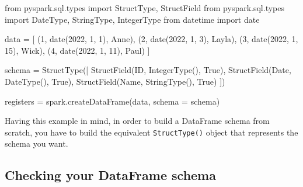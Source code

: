 \documentclass[
  11pt,
  letterpaper,
  DIV=11,
  numbers=noendperiod]{scrreprt}
\newenvironment{Shaded}{\begin{snugshade}}{\end{snugshade}}
\newcommand{\DecValTok}[1]{\textcolor[rgb]{0.68,0.00,0.00}{#1}}
\newcommand{\ImportTok}[1]{\textcolor[rgb]{0.00,0.46,0.62}{#1}}
\newcommand{\NormalTok}[1]{\textcolor[rgb]{0.00,0.23,0.31}{#1}}
\newcommand{\OperatorTok}[1]{\textcolor[rgb]{0.37,0.37,0.37}{#1}}
\newcommand{\StringTok}[1]{\textcolor[rgb]{0.13,0.47,0.30}{#1}}
\newcommand{\VariableTok}[1]{\textcolor[rgb]{0.07,0.07,0.07}{#1}}
\begin{document}
\begin{Shaded}
\begin{Highlighting}[]
\ImportTok{from}\NormalTok{ pyspark.sql.types }\ImportTok{import}\NormalTok{ StructType, StructField}
\ImportTok{from}\NormalTok{ pyspark.sql.types }\ImportTok{import}\NormalTok{ DateType, StringType, IntegerType}
\ImportTok{from}\NormalTok{ datetime }\ImportTok{import}\NormalTok{ date}

\NormalTok{data }\OperatorTok{=}\NormalTok{ [}
\NormalTok{  (}\DecValTok{1}\NormalTok{, date(}\DecValTok{2022}\NormalTok{, }\DecValTok{1}\NormalTok{, }\DecValTok{1}\NormalTok{), }\StringTok{\textquotesingle{}Anne\textquotesingle{}}\NormalTok{),}
\NormalTok{  (}\DecValTok{2}\NormalTok{, date(}\DecValTok{2022}\NormalTok{, }\DecValTok{1}\NormalTok{, }\DecValTok{3}\NormalTok{), }\StringTok{\textquotesingle{}Layla\textquotesingle{}}\NormalTok{),}
\NormalTok{  (}\DecValTok{3}\NormalTok{, date(}\DecValTok{2022}\NormalTok{, }\DecValTok{1}\NormalTok{, }\DecValTok{15}\NormalTok{), }\StringTok{\textquotesingle{}Wick\textquotesingle{}}\NormalTok{),}
\NormalTok{  (}\DecValTok{4}\NormalTok{, date(}\DecValTok{2022}\NormalTok{, }\DecValTok{1}\NormalTok{, }\DecValTok{11}\NormalTok{), }\StringTok{\textquotesingle{}Paul\textquotesingle{}}\NormalTok{)}
\NormalTok{]}

\NormalTok{schema }\OperatorTok{=}\NormalTok{ StructType([}
\NormalTok{  StructField(}\StringTok{\textquotesingle{}ID\textquotesingle{}}\NormalTok{, IntegerType(), }\VariableTok{True}\NormalTok{),}
\NormalTok{  StructField(}\StringTok{\textquotesingle{}Date\textquotesingle{}}\NormalTok{, DateType(), }\VariableTok{True}\NormalTok{),}
\NormalTok{  StructField(}\StringTok{\textquotesingle{}Name\textquotesingle{}}\NormalTok{, StringType(), }\VariableTok{True}\NormalTok{)}
\NormalTok{])}

\NormalTok{registers }\OperatorTok{=}\NormalTok{ spark.createDataFrame(data, schema }\OperatorTok{=}\NormalTok{ schema)}
\end{Highlighting}
\end{Shaded}

Having this example in mind, in order to build a DataFrame schema from
scratch, you have to build the equivalent \texttt{StructType()} object
that represents the schema you want.

\subsection{Checking your DataFrame
schema}\label{checking-your-dataframe-schema}
\end{document}
